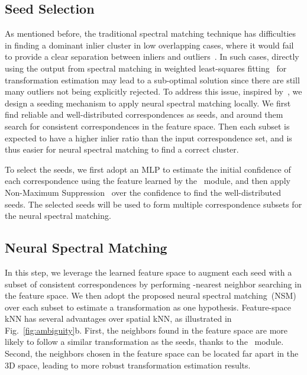 \subsection{Seed Selection}
\label{subsec:seed}
{As mentioned before, the traditional spectral matching {technique} has {difficulties} in finding {a} dominant inlier cluster in low overlapping cases, {where it would fail} to provide a clear separation between inliers and outliers~\cite{yang2019extreme}. {In such cases}, directly using the output from spectral matching in weighted least-squares fitting~\cite{besl1992method} for transformation estimation may lead to a sub-optimal solution since
there are still many outliers not being explicitly rejected.} 
To address this issue, inspired by~\cite{cavalli2020adalam}, we design a seeding mechanism to apply neural spectral matching locally. We first find reliable and well-distributed correspondences as seeds, {and around them search for consistent correspondences in the feature space.} Then each subset is expected to have a higher inlier ratio {than the input correspondence set}, {and is thus} easier for neural spectral matching to find {a} correct cluster.  


To select the seeds, we first adopt an MLP to estimate the initial confidence  of each correspondence using the feature  learned by the \nonlocal~module,
and then apply Non-Maximum Suppression~\cite{lowe2004distinctive} over the confidence to find the well-distributed seeds.
{The selected seeds will be used to form multiple correspondence subsets for the neural spectral matching.}







\subsection{Neural Spectral Matching}
\label{subsec:nsm}
In this step, we leverage the learned feature space to augment each seed with {a subset of} consistent correspondences by performing -nearest neighbor searching in the feature space.  
We then adopt {the proposed }neural spectral matching~(NSM)
over each subset to estimate {a} transformation as one hypothesis. Feature-space kNN has several advantages over spatial kNN, as illustrated in Fig.~\ref{fig:ambiguity}b. 
First, {the} neighbors found in the feature space are more likely to follow a similar transformation as the seeds, thanks to the \nonlocal~module. Second, the neighbors chosen in {the} feature space can be located far apart in {the} 3D space,
leading to more robust {transformation} estimation results. 

